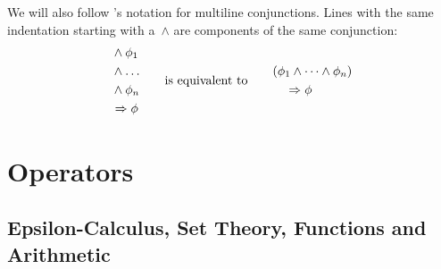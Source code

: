 \documentclass[11pt, a4paper, oneside]{article}
\begin{document}
We will also follow \TLA's notation for multiline conjunctions.  Lines with the same indentation starting with a~$\wedge$ are components of the same conjunction:
\begin{gather*}
    \begin{aligned}
        &\wedge \phi_1 \\
        &\wedge \dots \\
        &\wedge \phi_n \\
        &\Rightarrow \phi
    \end{aligned}
    \qquad\text{is equivalent to}\qquad
    \begin{aligned}
        &(\phi_1 \wedge \dots \wedge \phi_n) \\
        &\quad \Rightarrow \phi
    \end{aligned}
\end{gather*}


\newpage
\section{Operators}
\label{sec:operators}


    \subsection{Epsilon-Calculus, Set Theory, Functions and Arithmetic}
\end{document}
